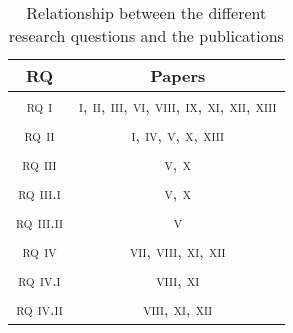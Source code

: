 \begin{table}[h]
\centering
\caption{Relationship between the different research questions and the publications}\label{table:RQPapers}
\begin{tabular}{|c|c|}
\hline
\rule{0pt}{12pt}
RQ&Papers\\ \hline
\textsc{rq i} & \textsc{i, ii, iii, vi, viii, ix, xi, xii, xiii}\\
\hline
\textsc{rq ii} & \textsc{i, iv, v, x, xiii}\\ \hline
\textsc{rq iii} & \textsc{v, x}\\ %
\textsc{rq iii.i} & \textsc{v, x}\\ %
\textsc{rq iii.ii} & \textsc{v}\\ \hline

\textsc{rq iv} & \textsc{vii, viii, xi, xii}\\ %
\textsc{rq iv.i} & \textsc{viii, xi}\\ %
\textsc{rq iv.ii} & \textsc{viii, xi, xii}\\ \hline

\end{tabular}
\end{table}
\bigskip




